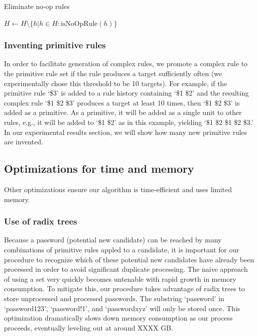 \documentclass[letterpaper,twocolumn,10pt]{article}
\begin{document}
\begin{algorithm}\caption{Eliminate no-op rules}
\begin{algorithmic}
    \State $H \gets H \setminus \{h|h\in H : \textrm{isNoOpRule}(h)\}$
\end{algorithmic}
\label{alg:eliminate-no-op}
\end{algorithm}

\subsubsection{Inventing primitive rules}

In order to facilitate generation of complex rules, we promote a complex rule
to the primitive rule set if the rule produces a target sufficiently often (we
experimentally chose this threshold to be 10 targets). For example, if the
primitive rule `\$3' is added to a rule history containing `\$1 \$2' and the
resulting complex rule `\$1 \$2 \$3' produces a target at least 10 times, then
`\$1 \$2 \$3' is added as a primitive. As a primitive, it will be added as a
single unit to other rules, e.g., it will be added to `\$1 \$2' as in this
example, yielding `\$1 \$2 \$1 \$2 \$3.' In our experimental results section,
we will show how many new primitive rules are invented.

\subsection{Optimizations for time and memory}

Other optimizations ensure our algorithm is time-efficient and uses limited
memory.

\subsubsection{Use of radix trees}

Because a password (potential new candidate) can be reached by many combinations of
primitive rules appled to a candidate, it is important for our procedure to recognize which
of these potential new candidates have already been processed in order to avoid significant
duplicate processing. The naive approach of using a set very quickly becomes untenable with
rapid growth in memory consumption. To mitigate this, our procedure takes advantage of radix trees
to store unprocessed and processed passwords. The substring `password' in 
`password123', `password!1', and `passwordxyz' will only be stored once. This optimization
dramatically slows down memory consumption as our process proceeds, eventually leveling out
at around XXXX GB.
\end{document}
